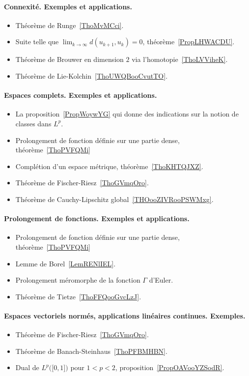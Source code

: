 \paragraph{Connexité. Exemples et applications.}
\begin{itemize}
	\item Théorème de Runge~\ref{ThoMvMCci}.
	\item Suite telle que \( \lim_{k\to \infty} d(u_{k+1},u_k)=0\), théorème~\ref{PropLHWACDU}.
	\item Théorème de Brouwer en dimension \( 2\) via l'homotopie~\ref{ThoLVViheK}.
	\item Théorème de Lie-Kolchin~\ref{ThoUWQBooCvutTO}.
\end{itemize}
\paragraph{Espaces complets. Exemples et applications.}
\begin{itemize}
	\item La proposition~\ref{PropWoywYG} qui donne des indications sur la notion de classes dans \( L^p\).
	\item Prolongement de fonction définie sur une partie dense, théorème~\ref{ThoPVFQMi}
	\item Complétion d'un espace métrique, théorème~\ref{ThoKHTQJXZ}.
	\item Théorème de Fischer-Riesz~\ref{ThoGVmqOro}.
	\item Théorème de Cauchy-Lipschitz global~\ref{THOooZIVRooPSWMxg}.
\end{itemize}
\paragraph{Prolongement de fonctions. Exemples et applications.}
\begin{itemize}
	\item Prolongement de fonction définie sur une partie dense, théorème~\ref{ThoPVFQMi}
	\item Lemme de Borel~\ref{LemRENlIEL}.
	\item Prolongement méromorphe de la fonction \( \Gamma\) d'Euler.
	\item Théorème de Tietze~\ref{ThoFFQooGvcLzJ}.
\end{itemize}
\paragraph{Espaces vectoriels normés, applications linéaires continues. Exemples.}
\begin{itemize}
	\item Théorème de Fischer-Riesz~\ref{ThoGVmqOro}.
	\item Théorème de Banach-Steinhaus~\ref{ThoPFBMHBN}.
	\item Dual de \( L^p\big( \mathopen[ 0 , 1 \mathclose] \big)\) pour \( 1<p<2\), proposition~\ref{PropOAVooYZSodR}.
\end{itemize}


